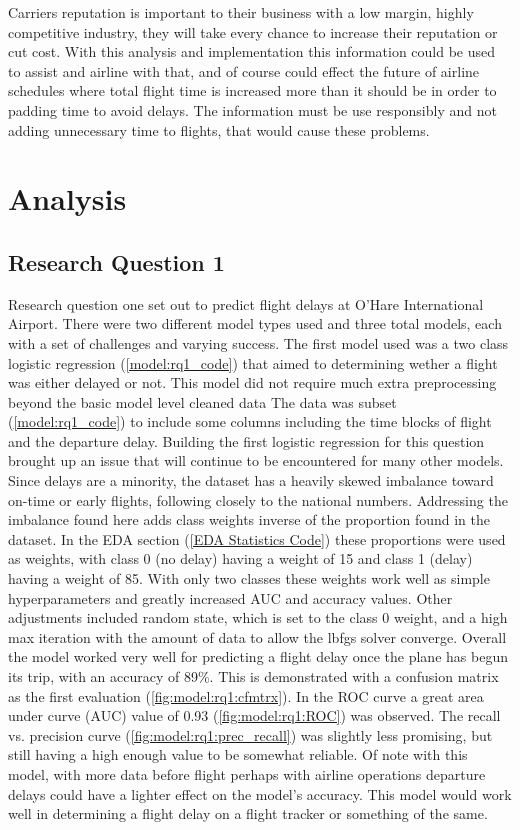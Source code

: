 \documentclass[a4paper,12pt]{article}
\begin{document}
Carriers reputation is important to their business with a low margin, highly competitive industry, they will take every chance to increase their reputation or cut cost.
With this analysis and implementation this information could be used to assist and airline with that, and of course could effect the future of airline schedules where total flight
time is increased more than it should be in order to padding time to avoid delays. The information must be use responsibly and not adding unnecessary time to flights, that
would cause these problems.

\pagebreak

\section{Analysis}

\subsection{Research Question 1} \label{analyze:rq1}

Research question one set out to predict flight delays at O'Hare International Airport. There were two different model types used and three total models, each with a set of challenges
and varying success. The first model used was a two class logistic regression (\ref{model:rq1_code}) that aimed to determining wether a flight was either delayed or not.
This model did not require much extra preprocessing beyond the basic model level cleaned data %
The data was subset (\ref{model:rq1_code}) to include some columns including the time blocks of flight and the departure delay.
Building the first logistic regression for this question brought up an issue that will continue to be encountered for many other models. Since delays are a minority, the dataset has a heavily
skewed imbalance toward on-time or early flights, following closely to the national numbers. Addressing the imbalance found here adds class weights inverse of the proportion found in the dataset.
In the EDA section (\ref{EDA Statistics Code}) these proportions were used as weights, with class 0 (no delay) having a weight of 15 and class 1 (delay) having a weight of 85. With only two classes these weights
work well as simple hyperparameters and greatly increased AUC and accuracy values. Other adjustments included random state, which is set to the class 0 weight, and a high max iteration with the amount of data to 
allow the lbfgs solver converge.
Overall the model worked very well for predicting a flight delay once the plane has begun its trip, with an accuracy of 89\%.
This is demonstrated with a confusion matrix as the first evaluation (\ref{fig:model:rq1:cfmtrx}).
In the ROC curve a great area under curve (AUC) value of 0.93 (\ref{fig:model:rq1:ROC}) was observed. The recall vs. precision curve (\ref{fig:model:rq1:prec_recall}) was slightly less promising, but still having a high enough value to be somewhat reliable.
Of note with this model, with more data before flight perhaps with airline operations
departure delays could have a lighter effect on the model's accuracy. This model would work well in determining a flight delay on a flight tracker or something of the same.
\end{document}
